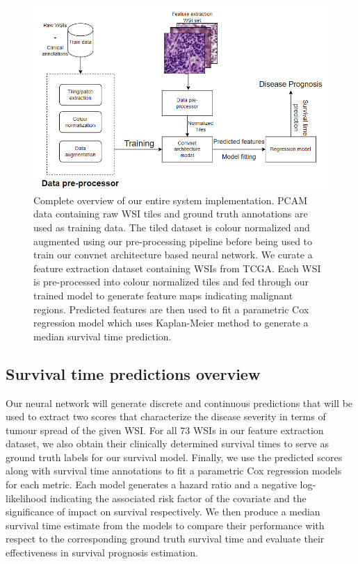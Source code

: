 \documentclass{l4proj}
\begin{document}
\begin{figure}[H]
    \centering
    \includegraphics[scale=0.7]{images/implementation-overview.png}
    \caption{Complete overview of our entire system implementation. PCAM data containing raw WSI tiles and ground truth annotations are used as training data. The tiled dataset is colour normalized and augmented using our pre-processing pipeline before being used to train our convnet architecture based neural network. We curate a feature extraction dataset containing WSIs from TCGA. Each WSI is pre-processed into colour normalized tiles and fed through our trained model to generate feature maps indicating malignant regions. Predicted features are then used to fit a parametric Cox regression model which uses Kaplan-Meier method to generate a median survival time prediction.}
    \label{fig:implementation-overview}
\end{figure}

\subsection{Survival time predictions overview}
Our neural network will generate discrete and continuous predictions that will be used to extract two scores that characterize the disease severity in terms of tumour spread of the given WSI. For all 73 WSIs in our feature extraction dataset, we also obtain their clinically determined survival times to serve as ground truth labels for our survival model. Finally, we use the predicted scores along with survival time annotations to fit a parametric Cox regression models for each metric. Each model generates a hazard ratio and a negative log-likelihood indicating the associated risk factor of the covariate and the significance of impact on survival respectively. We then produce a median survival time estimate from the models to compare their performance with respect to the corresponding ground truth survival time and evaluate their effectiveness in survival prognosis estimation.
\end{document}
